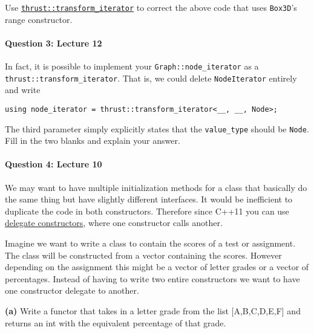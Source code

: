\documentclass[12pt,letterpaper,twoside]{article}
\begin{document}
Use 
\href{https://github.com/thrust/thrust/blob/master/thrust/iterator/transform_iterator.h}{\texttt{thrust::transform\_iterator}} 
to correct the above code that uses \texttt{Box3D}'s range constructor.

\begin{solution}

\end{solution}

\paragraph{Question 3: Lecture 12} In fact, it is possible to implement your \texttt{Graph::node\_iterator} as a \texttt{thrust::transform\_iterator}. That is, we could delete \texttt{NodeIterator} entirely and write
\begin{verbatim}
using node_iterator = thrust::transform_iterator<__, __, Node>;
\end{verbatim}
The third parameter simply explicitly states that the \texttt{value\_type} should be \texttt{Node}. Fill in the two blanks and explain your answer.

\begin{solution}

\end{solution}

\paragraph{Question 4: Lecture 10} 

We may want to have multiple initialization methods for a class that basically do the same thing but have slightly different interfaces. It would be inefficient to duplicate the code in both constructors. Therefore since C++11 you can use \href{https://en.cppreference.com/w/cpp/language/initializer_list#Delegating_constructor}{delegate constructors}, where one constructor calls another.

Imagine we want to write a class to contain the scores of a test or assignment. The class will be constructed from a vector containing the scores. However depending on the assignment this might be a vector of letter grades or a vector of percentages. Instead of having to write two entire constructors we want to have one constructor delegate to another.

\textbf{(a)} Write a functor that takes in a letter grade from the list [A,B,C,D,E,F] and returns an int with the equivalent percentage of that grade.
\end{document}
